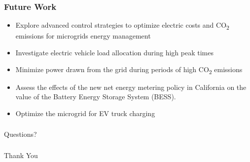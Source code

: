 \documentclass[aspectratio=169, 8 pt]{beamer}
\begin{document}
	\begin{frame}
		\frametitle{Future Work}
		\begin{itemize} \LARGE
			\item Explore advanced control strategies to optimize electric costs and CO\textsubscript{2} emissions for microgrids energy management
			\item Investigate electric vehicle load allocation during high peak times
			\item Minimize power drawn from the grid during periods of high CO\textsubscript{2} emissions
			\item Assess the effects of the new net energy metering policy in California on the value of the Battery Energy Storage System (BESS).
			\item  Optimize the microgrid for EV truck charging 
		\end{itemize}
	\end{frame}
	
	\begin{frame}
		\frametitle{\null}
		\centering
		\Huge
		Questions?
	\end{frame}
	
	\begin{frame}
		\frametitle{\null}
		\centering
		\Huge
		Thank You
	\end{frame}
\end{document}
